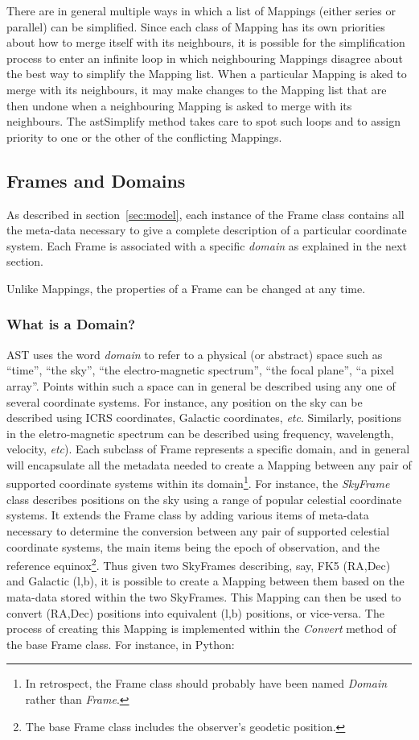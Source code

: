 \documentclass[final,authoryear,5p,times,twocolumn]{elsarticle}
\begin{document}
There are in general multiple ways in which a list of Mappings (either
series or parallel) can be simplified. Since each class of Mapping has
its own priorities about how to merge itself with its neighbours, it is
possible for the simplification process to enter an infinite loop in
which neighbouring Mappings disagree about the best way to simplify the
Mapping list. When a particular Mapping is aked to merge with its
neighbours, it may make changes to the Mapping list that are then undone
when a neighbouring Mapping is asked to merge with its neighbours. The
astSimplify method takes care to spot such loops and to assign priority
to one or the other of the conflicting Mappings.

\subsection{Frames and Domains}
As described in section~\ref{sec:model}, each instance of the Frame class
contains all the meta-data necessary to give a complete description of
a particular coordinate system. Each Frame is associated with a specific
\emph{domain} as explained in the next section.

Unlike Mappings, the properties of a Frame can be changed at any time.

\subsubsection{What is a Domain?}
AST uses the word \emph{domain} to refer to a physical (or abstract)
space such as ``time'', ``the sky'', ``the electro-magnetic spectrum'',
``the focal plane'', ``a pixel array''. Points within such a space can in
general be described using any one of several coordinate systems. For
instance, any position on the sky can be described using ICRS
coordinates, Galactic coordinates, \emph{etc}. Similarly, positions in
the eletro-magnetic spectrum can be described using frequency,
wavelength, velocity, \emph{etc}). Each subclass of Frame represents a
specific domain, and in general will encapsulate all the metadata needed
to create a Mapping between any pair of supported coordinate systems
within its domain\footnote{In retrospect, the Frame
class should probably have been named \emph{Domain} rather than
\emph{Frame}.}. For instance, the \emph{SkyFrame} class describes positions
on the sky using a range of popular celestial coordinate systems. It extends
the Frame class by adding various items of meta-data necessary to
determine the conversion between any pair of supported celestial coordinate
systems, the main
items being the epoch of observation, and the reference
equinox\footnote{The base Frame class includes the observer's geodetic
position.}. Thus given two SkyFrames describing, say, FK5 (RA,Dec) and
Galactic (l,b), it is possible to create a Mapping between them based on
the mata-data stored within the two SkyFrames. This Mapping can then be
used to convert (RA,Dec) positions into equivalent (l,b) positions, or
vice-versa. The process of creating this Mapping is implemented within
the \emph{Convert} method of the base Frame class. For instance, in
Python:
\end{document}
